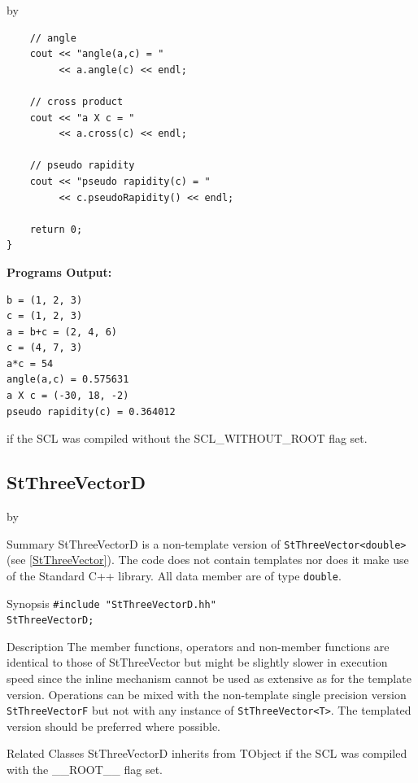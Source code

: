 \documentclass[twoside]{article}
\newcommand{\name}[1]{\textsf{#1}}%
\newcommand{\entrylabel}[1]{\mbox{\textbf{{#1}}}\hfil}%
\newenvironment{entry}
{\begin{list}{}%
    {\renewcommand{\makelabel}{\entrylabel}%
     \setlength{\labelwidth}{90pt}%
     \setlength{\leftmargin}{\labelwidth}
     \advance\leftmargin by \labelsep%
      }%
    }%
  {\end{list}}
\newcommand{\Entrylabel}[1]%
{\raisebox{0pt}[1ex][0pt]{\makebox[\labelwidth][l]%
    {\parbox[t]{\labelwidth}{\hspace{0pt}\textbf{{#1}}}}}}
\newenvironment{Entry}%
{\renewcommand{\entrylabel}{\Entrylabel}\begin{entry}}%
  {\end{entry}}
\begin{document}
\begin{description}
\begin{Entry}
{\begin{verbatim}
    // angle
    cout << "angle(a,c) = "
         << a.angle(c) << endl;

    // cross product
    cout << "a X c = "
         << a.cross(c) << endl;
    
    // pseudo rapidity
    cout << "pseudo rapidity(c) = "
         << c.pseudoRapidity() << endl;
    
    return 0;
}
\end{verbatim}

{\bf Programs Output:}

\begin{verbatim}
b = (1, 2, 3)
c = (1, 2, 3)
a = b+c = (2, 4, 6)
c = (4, 7, 3)
a*c = 54
angle(a,c) = 0.575631
a X c = (-30, 18, -2)
pseudo rapidity(c) = 0.364012
\end{verbatim}
}
\end{Entry}

\clearpage
    if the SCL was compiled without the \name{SCL\_WITHOUT\_ROOT} flag set.
%
%
\subsection{StThreeVectorD }
\begin{Entry}
\item[Summary]
    StThreeVectorD is a non-template version of \verb+StThreeVector<double>+
    (see \ref{StThreeVector}). The code does not contain templates nor
    does it make use of the Standard C++ library. All data member are of
    type \texttt{double}.
    
\item[Synopsis]
    \verb+#include "StThreeVectorD.hh"+ \\
    \verb+StThreeVectorD;+
    
    
\item[Description]       
    The member functions, operators and non-member functions are identical
    to those of StThreeVector but might be slightly slower in execution speed
    since the inline mechanism cannot be used as extensive as for the template
    version. Operations can be mixed with the non-template single precision version
    \texttt{StThreeVectorF} but not with any instance of \verb+StThreeVector<T>+.
    The templated version should be preferred where possible.
    
\item[Related Classes]
    StThreeVectorD inherits from TObject 
    if the SCL was compiled with the \name{\_\_ROOT\_\_} flag set.


\end{Entry}
\end{description}
\end{document}
